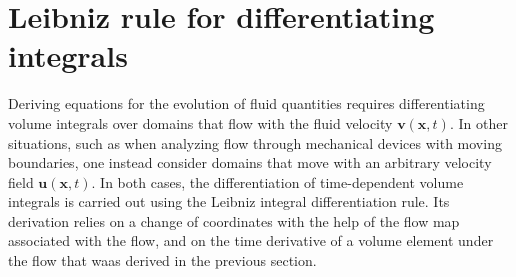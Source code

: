 \section{Leibniz rule for differentiating integrals}
Deriving equations for the evolution of fluid quantities requires differentiating volume integrals over domains that flow with the fluid velocity $\bm{v}(\bm{x},t)$. In other situations, such as when analyzing flow through mechanical devices with moving boundaries, one instead consider domains that move with an arbitrary velocity field $\bm{u}(\bm{x},t)$. In both cases, the differentiation of time-dependent volume integrals is carried out using the Leibniz integral differentiation rule. Its derivation relies on a change of coordinates with the help of the flow map associated with the flow, and on the time derivative of a volume element under the flow that waas derived in the previous section.

